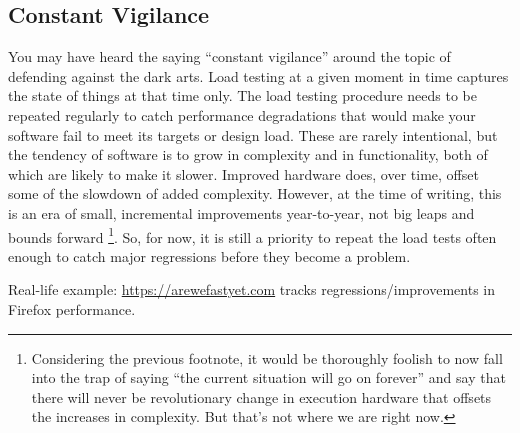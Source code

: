 \subsection*{Constant Vigilance}
You may have heard the saying ``constant vigilance'' around the topic of defending against the dark arts. Load testing at a given moment in time captures the state of things at that time only. The load testing procedure needs to be repeated regularly to catch performance degradations that would make your software fail to meet its targets or design load. These are rarely intentional, but the tendency of software is to grow in complexity and in functionality, both of which are likely to make it slower.  Improved hardware does, over time, offset some of the slowdown of added complexity. However, at the time of writing, this is an era of small, incremental improvements year-to-year, not big leaps and bounds forward \footnote{Considering the previous footnote, it would be thoroughly foolish to now fall into the trap of saying ``the current situation will go on forever'' and say that there will never be revolutionary change in execution hardware that offsets the increases in complexity. But that's not where we are right now.}. So, for now, it is still a priority to repeat the load tests often enough to catch major regressions before they become a problem.

Real-life example: \url{https://arewefastyet.com} tracks regressions/improvements in Firefox performance.





